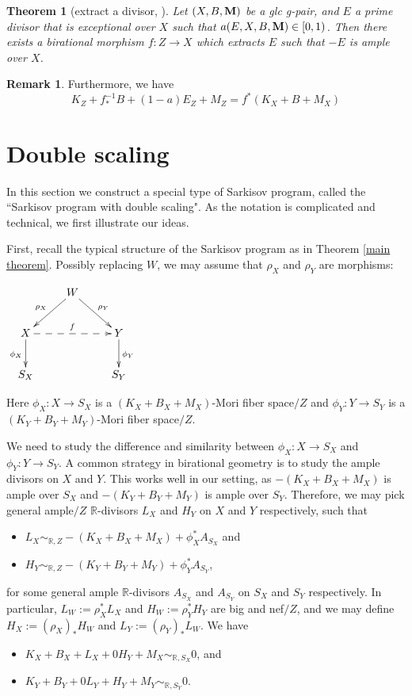 \documentclass[11pt]{amsart}
\numberwithin{equation}{section}
\newcommand{\Mm}{{\bf{M}}}
\newcommand{\Rr}{\mathbb{R}}
\newtheorem{thm}{Theorem}[section]
\theoremstyle{definition}
\theoremstyle{definition}
\theoremstyle{definition}
\newtheorem{remark}[theorem]{Remark}
\begin{document}
\begin{thm}[extract a divisor, {\cite[Theorem 1.7]{LX22b}}]\label{lem: extracting divisor}
Let $(X,B,\Mm)$ be a glc g-pair, and $E$ a prime divisor that is exceptional over $X$ such that $a(E,X,B,\Mm)\in [0,1)$. Then there exists a birational morphism $f: Z\to X$ which extracts $E$ such that $-E$ is ample over $X$.
\end{thm}
\begin{remark}
  Furthermore, we have 
  \[
  K_{Z}+f^{-1}_{*}B+(1-a)E_{Z}+M_{Z}=f^*(K_{X}+B+M_{X}) 
\]
\end{remark}

\section{Double scaling}
In this section we construct a special type of Sarkisov program, called the ``Sarkisov program with double scaling". As the notation is complicated and technical, we first illustrate our ideas.

First, recall the typical structure of the Sarkisov program as in Theorem \ref{main theorem}. Possibly replacing $W$, we may assume that $\rho_X$ and $\rho_Y$ are morphisms:
\begin{center}$\xymatrix{
 & W\ar@{->}[dl]_{\rho_X}\ar@{->}[dr]^{\rho_Y}& \\
      X \ar@{->}[d]_{\phi_X}\ar@{-->}[rr]^{f}   &  & Y\ar@{->}[d]^{\phi_Y} \\
    S_X & &S_Y }$
\end{center}
Here $\phi_X: X\rightarrow S_X$ is a $(K_X+B_X+M_X)$-Mori fiber space$/Z$ and $\phi_Y: Y\rightarrow S_Y$ is a $(K_Y+B_Y+M_Y)$-Mori fiber space$/Z$. 

We need to study the difference and similarity between $\phi_X: X\rightarrow S_X$ and $\phi_Y: Y\rightarrow S_Y$. A common strategy in birational geometry is to study the ample divisors on $X$ and $Y$. This works well in our setting, as $-(K_X+B_X+M_X)$ is ample over $S_X$ and  $-(K_Y+B_Y+M_Y)$ is ample over $S_Y$. Therefore, we may pick general ample$/Z$ $\Rr$-divisors $L_X$ and $H_Y$ on $X$ and $Y$ respectively, such that
\begin{itemize}
    \item $L_X\sim_{\Rr,Z}-(K_X+B_X+M_X)+\phi_X^*A_{S_X}$ and
    \item $H_Y\sim_{\Rr,Z}-(K_Y+B_Y+M_Y)+\phi_Y^*A_{S_Y}$, 
\end{itemize}
for some general ample $\Rr$-divisors $A_{S_X}$ and $A_{S_Y}$ on $S_X$ and $S_Y$ respectively. In particular, $L_W:=\rho_X^*L_X$ and $H_W:=\rho_Y^*H_Y$ are big and nef$/Z$, and we may define $H_X:=(\rho_X)_*H_W$ and $L_Y:=(\rho_Y)_*L_W$. We have
\begin{itemize}
    \item $K_X+B_X+L_X+0H_Y+M_X\sim_{\mathbb R,S_X}0$, and
    \item $K_Y+B_Y+0L_Y+H_Y+M_Y\sim_{\mathbb R,S_Y}0$.

\end{itemize}
\end{document}

